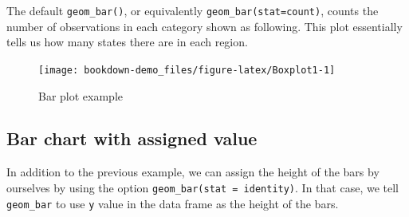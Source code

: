 \documentclass[]{book}
\newenvironment{Shaded}{\begin{snugshade}}{\end{snugshade}}
\newcommand{\KeywordTok}[1]{\textcolor[rgb]{0.13,0.29,0.53}{\textbf{#1}}}
\newcommand{\DataTypeTok}[1]{\textcolor[rgb]{0.13,0.29,0.53}{#1}}
\newcommand{\StringTok}[1]{\textcolor[rgb]{0.31,0.60,0.02}{#1}}
\newcommand{\OperatorTok}[1]{\textcolor[rgb]{0.81,0.36,0.00}{\textbf{#1}}}
\newcommand{\NormalTok}[1]{#1}
\begin{document}
The default \texttt{geom\_bar()}, or equivalently
\texttt{geom\_bar(stat=\textquotesingle{}count\textquotesingle{})},
counts the number of observations in each category shown as following.
This plot essentially tells us how many states there are in each region.

\begin{Shaded}
\end{Shaded}

\begin{figure}

{\centering \texttt{[image: bookdown-demo\_files/figure-latex/Boxplot1-1]} 

}

\caption{Bar plot example}\label{fig:Boxplot1}
\end{figure}

\subsection{Bar chart with assigned
value}\label{bar-chart-with-assigned-value}

In addition to the previous example, we can assign the height of the
bars by ourselves by using the option
\texttt{geom\_bar(stat\ =\ \textquotesingle{}identity\textquotesingle{})}.
In that case, we tell \texttt{geom\_bar} to use \texttt{y} value in the
data frame as the height of the bars.

\begin{Shaded}
\end{Shaded}
\end{document}
